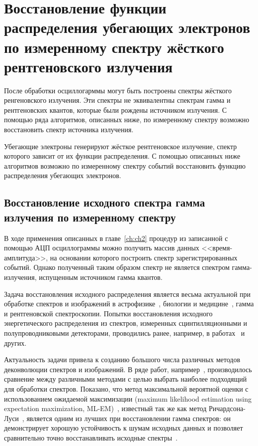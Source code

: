 \chapter{Восстановление функции распределения убегающих электронов по измеренному спектру жёсткого рентгеновского излучения}
\label{ch:ch3}

После обработки осциллогарммы могут быть построены спектры жёсткого ренгеновского излучения. Эти спектры не эквивалентны спектрам гамма и рентгеновских квантов, которые были рождены источником излучения. С помощью ряда алгоритмов, описанных ниже, по измеренному спектру возможно восстановить спектр источника излучения. 

Убегающие электроны генерируют жёсткое рентгеновское излучение, спектр которого зависит от их функции распределения. С помощью описанных ниже алгоритмов возможно по измеренному спектру событий восстановить функцию распределения убегающих электронов.


\section{Восстановление исходного спектра гамма излучения по измеренному спектру}

В ходе применения описанных в главе~\ref{ch:ch2} процедур из записанной с помощью АЦП осциллограммы можно получить массив данных <<время-амплитуда>>, на основании которого построить спектр зарегистрированных событий. Однако полученный таким образом спектр не является спектром гамма-излучения, испущенным источником гамма квантов. 

Задача восстановления исходного распределения является весьма актуальной при обработке спектров и изображений в астрофизике~\cite{JungRichardt2016}, биологии и медицине~\cite{Vardi1985}, гамма и рентгеновской спектроскопии. Попытки восстановления исходного энергетического распределения из спектров, измеренных сцинтилляционными и полупроводниковыми детекторами, проводились ранее, например, в работах~\cite{Raad2008,Meng2000} и других.

Актуальность задачи привела к созданию большого числа различных методов деконволюции спектров и изображений. В ряде работ, например~\cite{Meng2000,Lanteri1999,Morhac2011,Jeffrey1986,Bouchet1995}, производилось сравнение между различными методами с целью выбрать наиболее подходящий для обработки спектров. Показано, что метод максимальной вероятной оценки с использованием ожидаемой максимизации (maximum likelihood estimation using expectation maximization, ML-EM)~\cite{Vardi1985}, известный так же как метод Ричардсона-Луси~\cite{Richardson1972,Lucy1974}, является одним из лучших при восстановлении гамма спектров: он демонстрирует хорошую устойчивость к шумам исходных данных и позволяет сравнительно точно восстанавливать исходные спектры~\cite{Meng2000,Morhac2011}.

